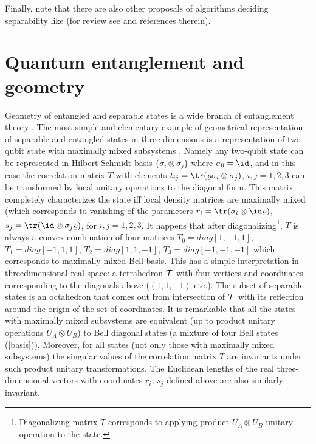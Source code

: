 \documentclass[rmp,12pt,preprint]{revtex4-2}
\begin{document}
Finally, note that there are also other proposals of algorithms
deciding separability like \cite{ZapatrinAlgorithm} (for review see
\cite{IoannouAlgorithm3} and references therein).



\section{Quantum entanglement and geometry}
\label{sec:ent_geom}

Geometry of entangled and separable states is a wide branch of
entanglement theory \cite{BengtssonZyczkowski-book}. The most simple
and elementary example of geometrical representation of separable and
entangled states in three dimensions is a representation of two-qubit
state with maximally mixed subsystems \cite{MRH-PRA96}. Namely any
two-qubit state can be represented in Hilbert-Schmidt basis $\{
\sigma_{i} \otimes \sigma_{j}\}$ where $\sigma_{0}=\id$, and in this
case the correlation matrix $T$ with elements $t_{ij}={\tr}(\varrho
\sigma_{i} \otimes \sigma_{j})$, $i,j=1,2,3$ can be transformed by
local unitary operations to the diagonal form. This matrix completely
characterizes the state iff local density matrices are maximally mixed
(which corresponds to vanishing of the parameters
$r_{i}={\tr}(\sigma_{i} \otimes \id \varrho)$, $s_{j}={\tr}( \id
\otimes \sigma_{j} \varrho)$, for $i,j=1,2,3$. It happens that after
diagonalizing\footnote{Diagonalizing matrix $T$ corresponds to
  applying product $U_{A} \otimes U_{B}$ unitary operation to the
  state.}, $T$ is always a convex combination of four matrices
$T_{0}=diag[1,-1,1]$, $T_{1}=diag[-1,1,1]$, $T_{2}=diag[1,1,-1]$,
$T_{3}=diag[-1,-1,-1]$ which corresponds to maximally mixed Bell
basis. This has a simple interpretation in threedimensional real
space: a tetrahedron ${\cal T}$ with four vertices and coordinates
corresponding to the diagonals above ($(1,1,-1)$ etc.). The subset of
separable states is an octahedron that comes out from intersection of
${\cal T}$ with its reflection around the origin of the set of
coordinates. It is remarkable that all the states with maximally mixed
subsystems are equivalent (up to product unitary operations $U_{A}
\otimes U_{B}$) to Bell diagonal states (a mixture of four Bell states
(\ref{basis})).  Moreover, for all states (not only those with
maximally mixed subsystems) the singular values of the correlation
matrix $T$ are invariants under such product unitary
transformations. The Euclidean lengths of the real three-dimensional
vectors with coordinates $r_{i}$, $s_{j}$ defined above are also
similarly invariant.
\end{document}
